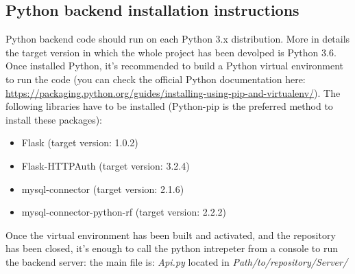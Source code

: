 \documentclass{article}
\begin{document}
\subsection{Python backend installation instructions}
Python backend code should run on each Python 3.x distribution. More in details the target version in which the whole project has been devolped is Python 3.6.\\
Once installed Python, it's recommended to build a Python virtual environment to run the code (you can check the official Python documentation here: \url{https://packaging.python.org/guides/installing-using-pip-and-virtualenv/}). The following libraries have to be installed (Python-pip is the preferred method to install these packages):
\begin{itemize}
	\item Flask (target version: 1.0.2)
	\item Flask-HTTPAuth (target version: 3.2.4)
	\item mysql-connector (target version: 2.1.6)
	\item mysql-connector-python-rf (target version: 2.2.2)
\end{itemize}
Once the virtual environment has been built and activated, and the repository has been closed, it's enough to call the python intrepeter from a console to run the backend server: the main file is: \textit{Api.py} located in \textit{Path/to/repository/Server/} 
\end{document}
